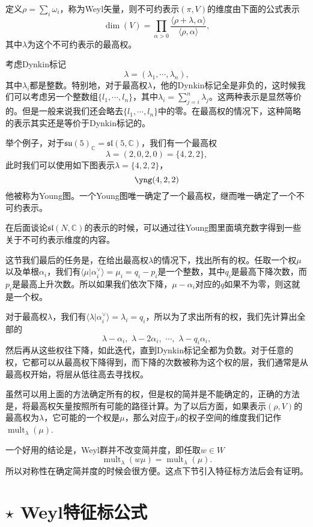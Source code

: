 \documentclass[9pt]{extarticle}
\newcommand{\cc}{\mathbb{C}}
\DeclareMathOperator{\mult}{mult}
\begin{document}
定义$\rho=\sum_i \omega_i$，称为Weyl矢量，则不可约表示$(\pi,V)$的维度由下面的公式表示
\[
	\dim(V)=\prod_{\alpha>0}\frac{\langle \rho+\lambda,\alpha\rangle}{\langle \rho,\alpha\rangle},
\]
其中$\lambda$为这个不可约表示的最高权。

\para 考虑Dynkin标记
\[
	\lambda=(\lambda_1,\cdots,\lambda_n),
\]
其中$\lambda_i$都是整数。特别地，对于最高权$\lambda$，他的Dynkin标记全是非负的，这时候我们可以考虑另一个整数组$\{l_1,\cdots,l_n\}$，其中$\lambda_i=\sum_{j=i}^n\lambda_j$。这两种表示是显然等价的。但是一般来说我们还会略去$\{l_1,\cdots,l_n\}$中的零。在最高权的情况下，这种简略的表示其实还是等价于Dynkin标记的。

举个例子，对于$\mathfrak{su}(5)_\cc=\mathfrak{sl}(5,\cc)$，我们有一个最高权
\[
	\lambda=(2,0,2,0)=\{4,2,2\},
\]
此时我们可以使用如下图表示$\lambda=\{4,2,2\}$，
\[
	\yng(4,2,2)
\]
他被称为Young图。一个Young图唯一确定了一个最高权，继而唯一确定了一个不可约表示。

在后面谈论$\mathfrak{sl}(N,\cc)$的表示的时候，可以通过往Young图里面填充数字得到一些关于不可约表示维度的内容。

\para 这节我们最后的任务是，在给出最高权$\lambda$的情况下，找出所有的权。任取一个权$\mu$以及单根$\alpha_i$，我们有$\langle\mu|\alpha^\vee_i\rangle=\mu_i=q_i-p_i$是一个整数，其中$q_i$是最高下降次数，而$p_i$是最高上升次数。所以如果我们依次下降，$\mu-\alpha_i$对应的$q$如果不为零，则这就是一个权。

对于最高权$\lambda$，我们有$\langle\lambda|\alpha^\vee_i\rangle=\lambda_i=q_i$，所以为了求出所有的权，我们先计算出全部的
\[
	\lambda-\alpha_i,\,\,\lambda-2\alpha_i,\,\,\cdots,\,\,\lambda-q_i\alpha_i,
\]
然后再从这些权往下降，如此迭代，直到Dynkin标记全都为负数。对于任意的权，它都可以从最高权下降得到，而下降的次数被称为这个权的层，我们通常是从最高权开始，将层从低往高去寻找权。

\para 虽然可以用上面的方法确定所有的权，但是权的简并是不能确定的，正确的方法是，将最高权矢量按照所有可能的路径计算。为了以后方面，如果表示$(\rho,V)$的最高权为$\lambda$，它可能的一个权是$\mu$，那么对应于$\mu$的权子空间的维度我们记作$\mult_\lambda(\mu)$.

一个好用的结论是，Weyl群并不改变简并度，即任取$w\in W$
\[
	\mult_\lambda(w\mu)=\mult_\lambda(\mu).
\]
所以对称性在确定简并度的时候会很方便。这点下节引入特征标方法后会有证明。

\section{ $\star$ Weyl特征标公式}
\end{document}
